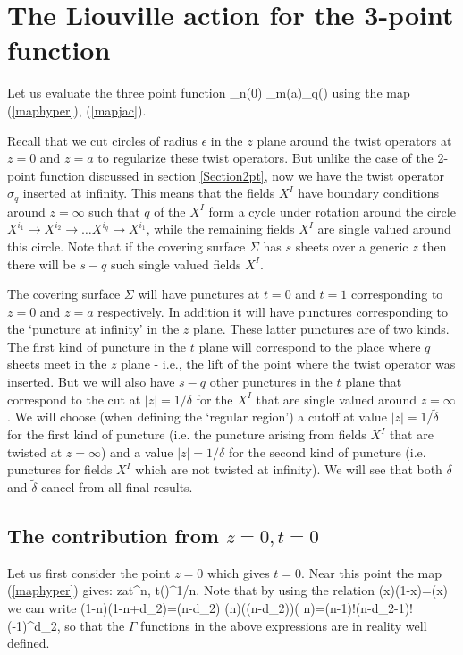 \documentclass[12pt]{article}
\begin{document}
\section{The Liouville action for the 3-point function}
\renewcommand{\theequation}{5.\arabic{equation}}
\setcounter{equation}{0}
Let us evaluate the three point function
\be
\langle \sigma_n(0) \sigma_m(a)\sigma_q(\infty)\rangle
\ee
using the map (\ref{maphyper}), (\ref{mapjac}).

Recall that we  cut circles of radius $\epsilon$ in the $z$ plane
around the twist operators at $z=0$ and $z=a$ to regularize
these twist operators.  But unlike the case of the
2-point function discussed in section \ref{Section2pt}, now we have the  twist
operator $\sigma_q$  inserted at infinity. This means
that the fields $X^I$ have boundary conditions around  $z=\infty$ 
such that $q$ of the $X^I$ form a cycle
under rotation around the circle $X^{i_1}\rightarrow
X^{i_2}\rightarrow\dots X^{i_q}\rightarrow X^{i_1}$, while the
remaining fields $X^I$ are single valued around this circle. Note
that if the covering surface $\Sigma$ has $s$ sheets over a
generic $z$ then there will be $s-q$ such single valued fields $X^I$.

The covering  surface $\Sigma$  will have punctures at $t=0$ and
$t=1$ corresponding to $z=0$ and $z=a$ respectively. In
addition it will have  punctures corresponding to the `puncture at
infinity'  in the $z$ plane.
These latter punctures are of two kinds. The first kind of puncture
in the $t$ plane will correspond to the place where $q$
sheets meet in the $z$ plane - i.e., the lift of the point where the
twist operator was inserted. But we will also have $s-q$
other punctures in the $t$ plane that correspond to the cut at
$|z|=1/\delta$ for the $X^I$ that are single valued around
$z=\infty$. We will choose (when defining the `regular region') a 
cutoff at value $|z|=1/\tilde\delta$ for
the first kind of puncture  (i.e. the puncture arising from fields 
$X^I$ that are twisted at $z=\infty$) and a
value
$|z|=1/\delta$   for the second kind of puncture (i.e. punctures for fields
$X^I$ which are not twisted at infinity).  We will see that both
$\delta$ and
$\tilde\delta$ cancel  from all final results.

\subsection{The contribution from  $z=0, t=0$}

Let us first consider the point  $z=0$ which gives $t=0$.
Near this point the map (\ref{maphyper}) gives:
\be
z\approx at^n,
\qquad
t\approx\left(\right)^{1/n}.
\ee
Note that by using the relation
\be
\Gamma(x)\Gamma(1-x)={\pi\over \sin(\pi x)}
\label{sone}
\ee
we can write
\be
{\Gamma(1-n)\over \Gamma(1-n+d_2)}={\Gamma(n-d_2)\over
\Gamma(n)}{\sin(\pi(n-d_2))\over \sin(\pi
n)}={(n-1)!\over (n-d_2-1)!}(-1)^{d_2}\label{stwo},
\ee
so that the $\Gamma$ functions in the above expressions are in reality
well defined.
\end{document}

